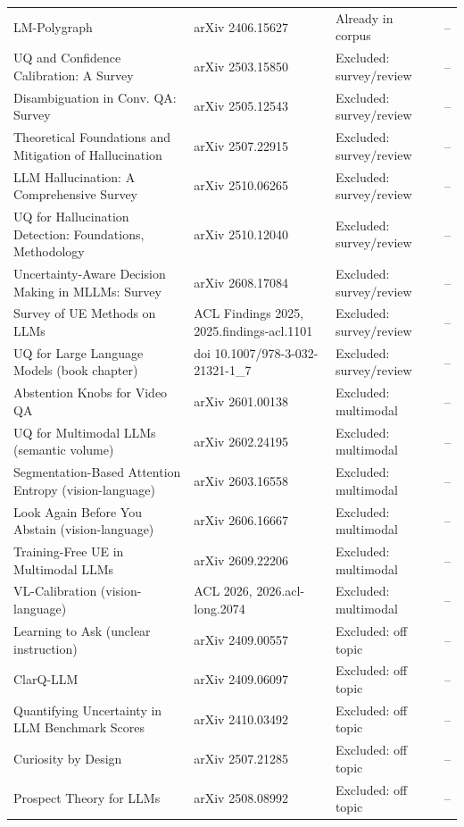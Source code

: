 \documentclass[acmsmall]{acmart}
\begin{document}
\begin{center}
\begin{longtable}{@{}p{5.6cm} p{3.6cm} p{2.4cm} p{0.9cm}@{}}
LM-Polygraph & arXiv 2406.15627 & Already in corpus & -- \\
UQ and Confidence Calibration: A Survey & arXiv 2503.15850 & Excluded: survey/review & -- \\
Disambiguation in Conv. QA: Survey & arXiv 2505.12543 & Excluded: survey/review & -- \\
Theoretical Foundations and Mitigation of Hallucination & arXiv 2507.22915 & Excluded: survey/review & -- \\
LLM Hallucination: A Comprehensive Survey & arXiv 2510.06265 & Excluded: survey/review & -- \\
UQ for Hallucination Detection: Foundations, Methodology & arXiv 2510.12040 & Excluded: survey/review & -- \\
Uncertainty-Aware Decision Making in MLLMs: Survey & arXiv 2608.17084 & Excluded: survey/review & -- \\
Survey of UE Methods on LLMs & ACL Findings 2025, 2025.findings-acl.1101 & Excluded: survey/review & -- \\
UQ for Large Language Models (book chapter) & doi 10.1007/978-3-032-21321-1\_7 & Excluded: survey/review & -- \\
Abstention Knobs for Video QA & arXiv 2601.00138 & Excluded: multimodal & -- \\
UQ for Multimodal LLMs (semantic volume) & arXiv 2602.24195 & Excluded: multimodal & -- \\
Segmentation-Based Attention Entropy (vision-language) & arXiv 2603.16558 & Excluded: multimodal & -- \\
Look Again Before You Abstain (vision-language) & arXiv 2606.16667 & Excluded: multimodal & -- \\
Training-Free UE in Multimodal LLMs & arXiv 2609.22206 & Excluded: multimodal & -- \\
VL-Calibration (vision-language) & ACL 2026, 2026.acl-long.2074 & Excluded: multimodal & -- \\
Learning to Ask (unclear instruction) & arXiv 2409.00557 & Excluded: off topic & -- \\
ClarQ-LLM & arXiv 2409.06097 & Excluded: off topic & -- \\
Quantifying Uncertainty in LLM Benchmark Scores & arXiv 2410.03492 & Excluded: off topic & -- \\
Curiosity by Design & arXiv 2507.21285 & Excluded: off topic & -- \\
Prospect Theory for LLMs & arXiv 2508.08992 & Excluded: off topic & -- \\

\end{longtable}
\end{center}
\end{document}
